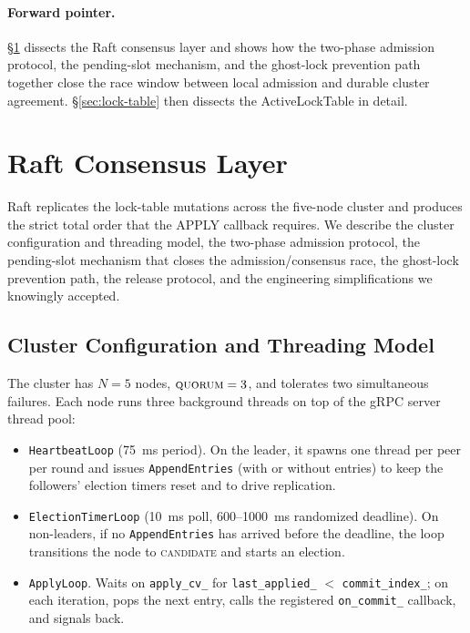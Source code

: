 \documentclass[sigconf]{acmart}
\begin{document}
\paragraph{Forward pointer.}
\S\ref{sec:raft} dissects the Raft consensus layer and shows how the
two-phase admission protocol, the pending-slot mechanism, and the ghost-lock
prevention path together close the race window between local admission and
durable cluster agreement. \S\ref{sec:lock-table} then dissects the
ActiveLockTable in detail.

\section{Raft Consensus Layer}
\label{sec:raft}

Raft replicates the lock-table mutations across the five-node cluster and
produces the strict total order that the APPLY callback requires. We
describe the cluster configuration and threading model, the two-phase
admission protocol, the pending-slot mechanism that closes the
admission/consensus race, the ghost-lock prevention path, the release
protocol, and the engineering simplifications we knowingly accepted.

\subsection{Cluster Configuration and Threading Model}
\label{sec:cluster-config}

The cluster has $N{=}5$ nodes, $\textsc{quorum}=3$, and tolerates two
simultaneous failures. Each node runs three background threads on top of
the gRPC server thread pool:

\begin{itemize}
\item \texttt{HeartbeatLoop} (75~ms period). On the leader, it spawns one
  thread per peer per round and issues \texttt{AppendEntries} (with or
  without entries) to keep the followers' election timers reset and to
  drive replication.
\item \texttt{ElectionTimerLoop} (10~ms poll, 600--1000~ms randomized
  deadline). On non-leaders, if no \texttt{AppendEntries} has arrived
  before the deadline, the loop transitions the node to \textsc{candidate}
  and starts an election.
\item \texttt{ApplyLoop}. Waits on \texttt{apply\_cv\_} for
  \texttt{last\_applied\_} $<$ \texttt{commit\_index\_}; on each iteration,
  pops the next entry, calls the registered \texttt{on\_commit\_}
  callback, and signals back.
\end{itemize}
\end{document}
